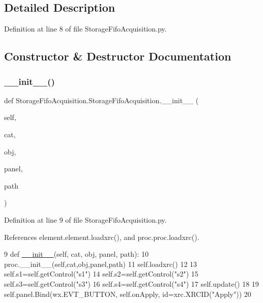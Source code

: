 \subsection{Detailed Description}


Definition at line 8 of file Storage\+Fifo\+Acquisition.\+py.



\subsection{Constructor \& Destructor Documentation}
\mbox{\label{classStorageFifoAcquisition_1_1StorageFifoAcquisition_aabce5452517625e2eac4392eb18a8364}} 
\subsubsection{\texorpdfstring{\+\_\+\+\_\+init\+\_\+\+\_\+()}{\_\_init\_\_()}}
{\footnotesize\ttfamily def Storage\+Fifo\+Acquisition.\+Storage\+Fifo\+Acquisition.\+\_\+\+\_\+init\+\_\+\+\_\+ (\begin{DoxyParamCaption}\item[{}]{self,  }\item[{}]{cat,  }\item[{}]{obj,  }\item[{}]{panel,  }\item[{}]{path }\end{DoxyParamCaption})}



Definition at line 9 of file Storage\+Fifo\+Acquisition.\+py.



References element.\+element.\+loadxrc(), and proc.\+proc.\+loadxrc().


\begin{DoxyCode}
9     \textcolor{keyword}{def }\hyperlink{classwrapper_1_1ModuleDictWrapper_a9a7a794150502f51df687831583e13b9}{\_\_init\_\_}(self, cat, obj, panel, path):
10         proc.\_\_init\_\_(self,cat,obj,panel,path)
11         self.loadxrc()
12 
13         self.s1=self.getControl(\textcolor{stringliteral}{"s1"})
14         self.s2=self.getControl(\textcolor{stringliteral}{"s2"})
15         self.s3=self.getControl(\textcolor{stringliteral}{"s3"})
16         self.s4=self.getControl(\textcolor{stringliteral}{"s4"})
17         self.update()
18 
19         self.panel.Bind(wx.EVT\_BUTTON, self.onApply, id=xrc.XRCID(\textcolor{stringliteral}{"Apply"}))
20 
\end{DoxyCode}



